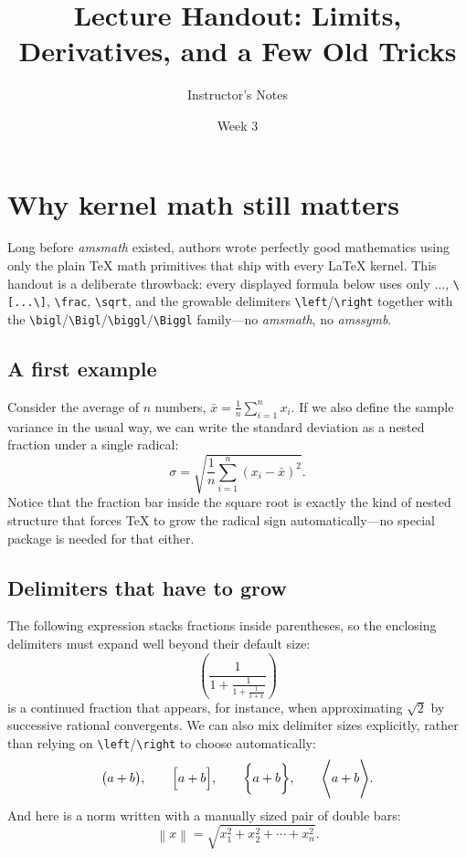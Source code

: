 \documentclass[12pt]{article}
\title{Lecture Handout: Limits, Derivatives, and a Few Old Tricks}
\author{Instructor's Notes}
\date{Week 3}
\begin{document}
\maketitle

\section{Why kernel math still matters}

Long before \emph{amsmath} existed, authors wrote perfectly good mathematics using only
the plain \TeX{} math primitives that ship with every \LaTeX{} kernel. This handout is a
deliberate throwback: every displayed formula below uses only $\ldots$, \verb|\[...\]|,
\verb|\frac|, \verb|\sqrt|, and the growable delimiters \verb|\left|/\verb|\right| together
with the \verb|\bigl|/\verb|\Bigl|/\verb|\biggl|/\verb|\Biggl| family---no
\emph{amsmath}, no \emph{amssymb}.

\subsection{A first example}

Consider the average of $n$ numbers, $\bar{x} = \frac{1}{n}\sum_{i=1}^{n} x_i$. If we also
define the sample variance in the usual way, we can write the standard deviation as a
nested fraction under a single radical:
\[
  \sigma = \sqrt{\frac{1}{n} \sum_{i=1}^{n} \left( x_i - \bar{x} \right)^2}.
\]
Notice that the fraction bar inside the square root is exactly the kind of nested structure
that forces \TeX{} to grow the radical sign automatically---no special package is needed
for that either.

\subsection{Delimiters that have to grow}

The following expression stacks fractions inside parentheses, so the enclosing delimiters
must expand well beyond their default size:
\[
  \left( \frac{1}{1 + \frac{1}{1 + \frac{1}{1 + x}}} \right)
\]
is a continued fraction that appears, for instance, when approximating $\sqrt{2}$ by
successive rational convergents. We can also mix delimiter sizes explicitly, rather than
relying on \verb|\left|/\verb|\right| to choose automatically:
\[
  \bigl( a + b \bigr), \qquad
  \Bigl[ a + b \Bigr], \qquad
  \biggl\{ a + b \biggr\}, \qquad
  \Biggl\langle a + b \Biggr\rangle.
\]
And here is a norm written with a manually sized pair of double bars:
\[
  \left\| x \right\| = \sqrt{ x_1^2 + x_2^2 + \cdots + x_n^2 }.
\]
\end{document}
